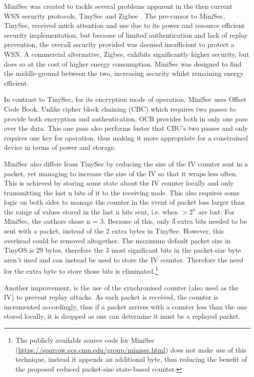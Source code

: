 MiniSec was created to tackle several problems apparent in the then current WSN security protocols, TinySec and Zigbee \cite{MiniSec}. The pre-cursor to MiniSec, TinySec, received much attention and use due to its power and resource efficient security implementation, but because of limited authentication and lack of replay prevention, the overall security provided was deemed insufficient to protect a WSN. A commercial alternative, Zigbee, exhibits significantly higher security, but does so at the cost of higher energy consumption. MiniSec was designed to find the middle-ground between the two, increasing security whilst remaining energy efficient. 

In contrast to TinySec, for its encryption mode of operation, MiniSec uses Offset Code Book. Unlike cipher block chaining (CBC) which requires two passes to provide both encryption and authentication, OCB provides both in only one pass over the data. This one pass also performs faster that CBC's two passes and only requires one key for operation, thus making it more appropriate for a constrained device in terms of power and storage. 

MiniSec also differs from TinySec by reducing the size of the IV counter sent in a packet, yet managing to increase the size of the IV so that it wraps less often. This is achieved by storing some state about the IV counter locally and only transmitting the last n bits of it to the receiving node. This also requires some logic on both sides to manage the counter in the event of packet loss larger than the range of values stored in the last n bits sent, i.e. when $>2^n$ are lost. For MiniSec, the authors chose n = 3. Because of this, only 3 extra bits needed to be sent with a packet, instead of the 2 extra bytes in TinySec. However, this overhead could be removed altogether. The maximum default packet size in TinyOS is 29 bytes, therefore the 3 most significant bits in the packet-size byte aren't used and can instead be used to store the IV counter. Therefore the need for the extra byte to store those bits is eliminated.\footnote{The publicly available source code for MiniSec (\url{https://sparrow.ece.cmu.edu/group/minisec.html}) does not make use of this technique, instead it appends an additional byte, thus reducing the benefit of the proposed reduced packet-size state-based counter.}

Another improvement, is the use of the synchronised counter (also used as the IV) to prevent replay attacks. As each packet is received, the counter is incremented accordingly, thus if a packet arrives with a counter less than the one stored locally, it is dropped as one can determine it must be a replayed packet. 
